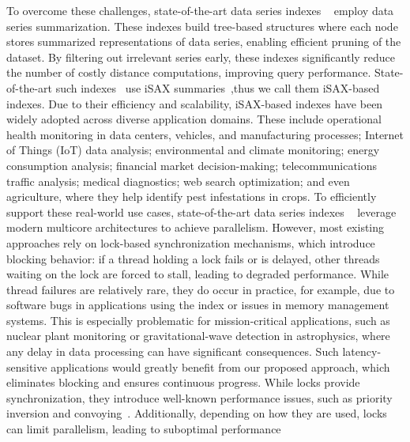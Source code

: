 To overcome these challenges, state-of-the-art data series indexes
~\cite{DBLP:journals/pvldb/EchihabiZPB18,isax2plus,wang2013data,peng2018paris,parisplus,peng2020messi,PFP21-I,PFP21-II,hercules,dumpy}
employ data series summarization. These indexes build tree-based structures where each node 
stores summarized representations of data series, enabling efficient pruning of the dataset.
By filtering out irrelevant series early, these indexes significantly reduce the number of costly 
distance computations, improving query performance.
State-of-the-art such indexes~\cite{peng2020messi,parisplus,peng2021sing} 
use iSAX summaries~\cite{isax2plus,isaxfamily},thus we call them iSAX-based indexes.  
%
Due to their efficiency and scalability, iSAX-based indexes have been widely adopted across 
diverse application domains. These include operational health monitoring in data centers, 
vehicles, and manufacturing processes; Internet of Things (IoT) data analysis; environmental 
and climate monitoring; energy consumption analysis; financial market decision-making; 
telecommunications traffic analysis; medical diagnostics; web search optimization; 
and even agriculture, where they help identify pest infestations in crops.
%
To efficiently support these real-world use cases, state-of-the-art data series indexes
~\cite{DBLP:journals/pvldb/EchihabiZPB18,isaxfamily,peng2018paris,peng2020messi,PFP21-I,PFP21-II,hercules} 
leverage modern multicore architectures to achieve parallelism. However, most existing 
approaches rely on lock-based synchronization mechanisms, which introduce blocking behavior:
if a thread holding a lock fails or is delayed, other threads waiting on the lock are forced to stall,
leading to degraded performance.
While thread failures are relatively rare, they do occur in practice, for example, due to 
software bugs in applications using the index or issues in memory management systems. 
This is especially problematic for mission-critical applications, such as nuclear plant 
monitoring or gravitational-wave detection in astrophysics, where any delay in data processing 
can have significant consequences. Such latency-sensitive applications would greatly benefit
from our proposed approach, which eliminates blocking and ensures continuous progress.
%
While locks provide synchronization, they introduce well-known performance issues, 
such as priority inversion and convoying~\cite{F04}. Additionally, depending on how they
are used, locks can limit parallelism, leading to suboptimal performance

